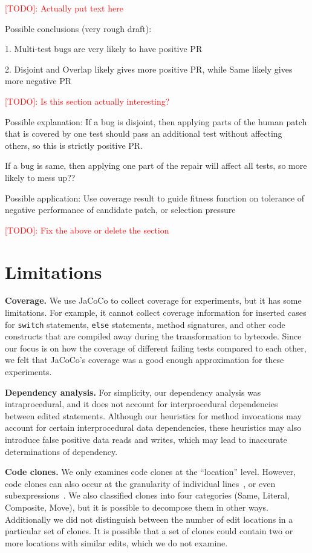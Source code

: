 \documentclass[10pt, conference]{IEEEtran}
\newcommand\todo[1]{\textcolor{red}{#1}}
\begin{document}
\todo{[TODO]: Actually put text here}

Possible conclusions (very rough draft): 

1. Multi-test bugs are very likely to have positive PR

2. Disjoint and Overlap likely gives more positive PR, while Same likely gives more negative PR

\todo{[TODO]: Is this section actually interesting?}

Possible explanation: If a bug is disjoint, then applying parts of the human patch that is covered by one test should pass an additional test without affecting others, so this is strictly positive PR. 

If a bug is same, then applying one part of the repair will affect all tests, so more likely to mess up??

Possible application: Use coverage result to guide fitness function on tolerance of negative performance of candidate patch, or selection pressure

\todo{[TODO]: Fix the above or delete the section}

\section{Limitations}
\label{sec:limits}

\noindent\textbf{Coverage.}
We use JaCoCo to collect coverage for experiments, but it has some
limitations. For example, it cannot collect coverage information for inserted
cases for \texttt{switch} statements, \texttt{else} statements, method
signatures, and other code constructs that are compiled away during the
transformation to bytecode. Since our focus is on how the coverage of different
failing tests compared to each other, we felt that JaCoCo's coverage was a good
enough approximation for these experiments.

\vspace{1ex}
\noindent\textbf{Dependency analysis.}
For simplicity, our dependency analysis was intraprocedural, and it
does not account for interprocedural dependencies between edited statements.  Although our
heuristics for method invocations may account for certain interprocedural data
dependencies, these heuristics may also introduce false positive data reads and
writes, which may lead to inaccurate determinations of dependency.

\vspace{1ex}
\noindent\textbf{Code clones.}
We only examines code clones at the ``location'' level.  However, code clones can also occur at the
granularity of individual lines~\cite{JiaClones}, or even
subexpressions~\cite{microclones}. We also classified clones into four
categories (Same, Literal, Composite, Move), but it is possible to decompose
them in other ways.
%
Additionally we did not distinguish between the number
of edit locations in a particular set of clones. It is possible that a set of
clones could contain two or more locations with similar edits, which we do not examine. 
\end{document}
